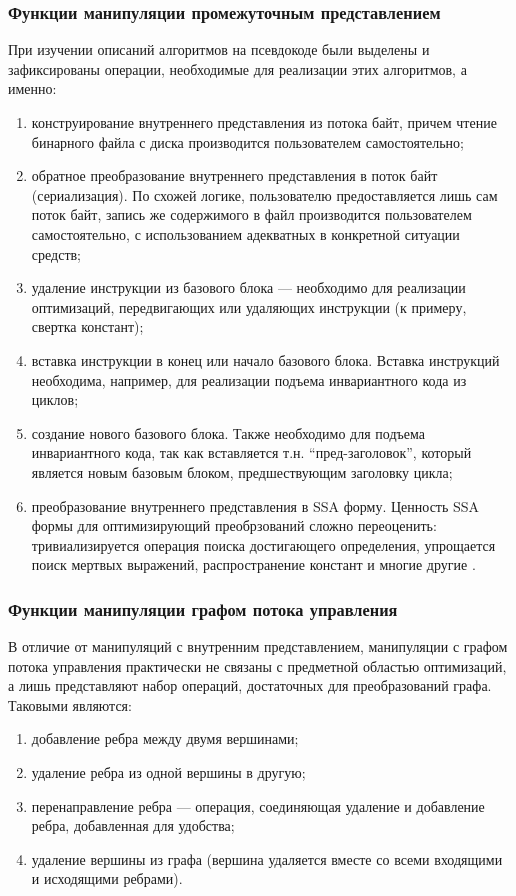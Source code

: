 \documentclass[14pt]{extarticle}
\begin{document}
\subsubsection{Функции манипуляции промежуточным представлением}
При изучении описаний алгоритмов на псевдокоде были выделены и зафиксированы операции, необходимые для реализации этих алгоритмов, а именно:
\begin{enumerate}
	\item конструирование внутреннего представления из потока байт, причем чтение бинарного файла с диска производится пользователем самостоятельно;
	\item обратное преобразование внутреннего представления в поток байт (сериализация). По схожей логике, пользователю предоставляется лишь сам поток байт, запись же содержимого в файл производится пользователем самостоятельно, с использованием адекватных в конкретной ситуации средств;
	\item удаление инструкции из базового блока --- необходимо для реализации оптимизаций, передвигающих или удаляющих инструкции (к примеру, свертка констант);
	\item вставка инструкции в конец или начало базового блока. Вставка инструкций необходима, например, для реализации подъема инвариантного кода из циклов;
	\item создание нового базового блока. Также необходимо для подъема инвариантного кода, так как вставляется т.н. \enquote{пред-заголовок}, который является новым базовым блоком, предшествующим заголовку цикла;
	\item преобразование внутреннего представления в SSA форму. Ценность SSA формы для оптимизирующий преобрзований сложно переоценить: тривиализируется операция поиска достигающего определения, упрощается поиск мертвых выражений, распространение констант и многие другие \cite{mun97}.
\end{enumerate}


\subsubsection{Функции манипуляции графом потока управления}
В отличие от манипуляций с внутренним представлением, манипуляции с графом потока управления практически не связаны с предметной областью оптимизаций, а лишь представляют набор операций, достаточных для преобразований графа. Таковыми являются:
\begin{enumerate}
	\item добавление ребра между двумя вершинами;
	\item удаление ребра из одной вершины в другую;
	\item перенаправление ребра --- операция, соединяющая удаление и добавление ребра, добавленная для удобства;
	\item удаление вершины из графа (вершина удаляется вместе со всеми входящими и исходящими ребрами).
\end{enumerate}
\end{document}
